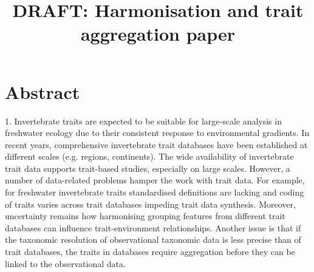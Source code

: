 \documentclass{article}
\title{DRAFT: Harmonisation and trait aggregation paper }
\author{}%
\date{}
\begin{document}
\maketitle


\section*{Abstract}




1. Invertebrate traits are expected to be suitable for large-scale analysis in freshwater ecology due to their consistent response to environmental gradients. In recent years, comprehensive invertebrate trait databases have been established at different scales (e.g. regions, continents). The wide availability of invertebrate trait data supports trait-based studies, especially on large scales. However, a number of data-related problems hamper the work with trait data. For example, for freshwater invertebrate traits standardised definitions are lacking and coding of traits varies across trait databases impeding trait data synthesis. Moreover, uncertainty remains how harmonising grouping features from different trait databases can influence trait-environment relationships. Another issue is that if the taxonomic resolution of observational taxonomic data is less precise than of trait databases, the traits in databases require aggregation before they can be linked to the observational data.
\end{document}
